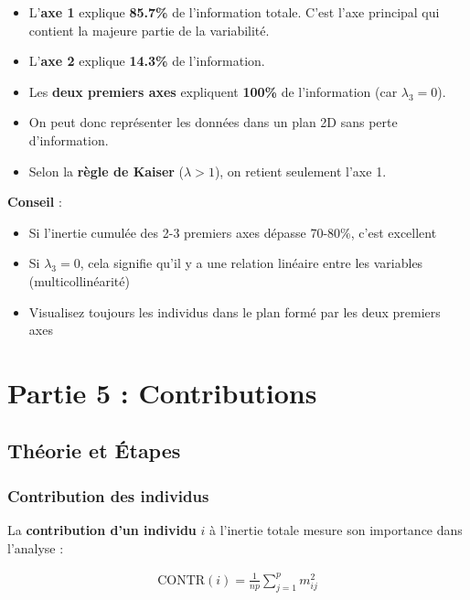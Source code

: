 \documentclass[11pt,a4paper]{article}
\begin{document}
\begin{itemize}
    \item L'\textbf{axe 1} explique \textbf{85.7\%} de l'information totale. C'est l'axe principal qui contient la majeure partie de la variabilité.
    \item L'\textbf{axe 2} explique \textbf{14.3\%} de l'information.
    \item Les \textbf{deux premiers axes} expliquent \textbf{100\%} de l'information (car $\lambda_3 = 0$).
    \item On peut donc représenter les données dans un plan 2D sans perte d'information.
    \item Selon la \textbf{règle de Kaiser} ($\lambda > 1$), on retient seulement l'axe 1.
\end{itemize}

\begin{conseilbox}
\textbf{Conseil} : 
\begin{itemize}
    \item Si l'inertie cumulée des 2-3 premiers axes dépasse 70-80\%, c'est excellent
    \item Si $\lambda_3 = 0$, cela signifie qu'il y a une relation linéaire entre les variables (multicollinéarité)
    \item Visualisez toujours les individus dans le plan formé par les deux premiers axes
\end{itemize}
\end{conseilbox}

\newpage

\section{Partie 5 : Contributions}

\subsection{Théorie et Étapes}

\subsubsection{Contribution des individus}

La \textbf{contribution d'un individu} $i$ à l'inertie totale mesure son importance dans l'analyse :

\begin{align*}
\text{CONTR}(i) = \frac{1}{np}\sum_{j=1}^{p} m_{ij}^2
\end{align*}
\end{document}
